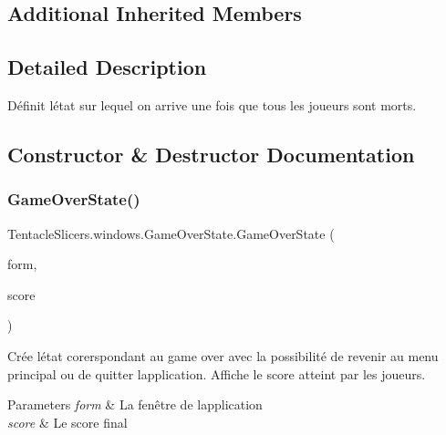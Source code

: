\subsection*{Additional Inherited Members}


\subsection{Detailed Description}
Définit l\textquotesingle{}état sur lequel on arrive une fois que tous les joueurs sont morts. 



\subsection{Constructor \& Destructor Documentation}
\mbox{\label{class_tentacle_slicers_1_1windows_1_1_game_over_state_a83996b3500091f86e4b6c295f6b664bf}} 
\subsubsection{\texorpdfstring{Game\+Over\+State()}{GameOverState()}}
{\footnotesize\ttfamily Tentacle\+Slicers.\+windows.\+Game\+Over\+State.\+Game\+Over\+State (\begin{DoxyParamCaption}\item[{\hyperlink{class_tentacle_slicers_1_1windows_1_1_main_form}{Main\+Form}}]{form,  }\item[{int}]{score }\end{DoxyParamCaption})}



Crée l\textquotesingle{}état corerspondant au game over avec la possibilité de revenir au menu principal ou de quitter l\textquotesingle{}application. Affiche le score atteint par les joueurs. 


\begin{DoxyParams}{Parameters}
{\em form} & La fenêtre de l\textquotesingle{}application \\
\hline
{\em score} & Le score final \\
\hline
\end{DoxyParams}


